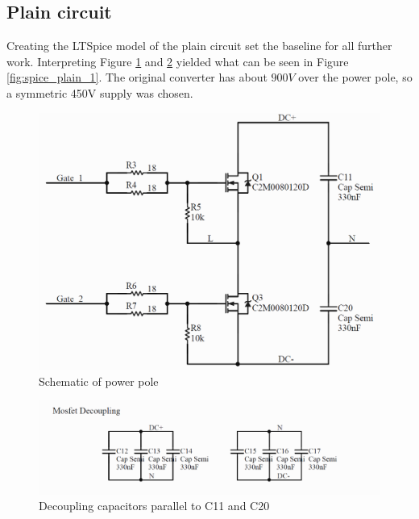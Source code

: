 \subsection{Plain circuit}
\label{sec:plain}

Creating the LTSpice model of the plain circuit set the baseline for all further work. Interpreting Figure \ref{fig:schematic_altium_1} and \ref{fig:schematic_altium_2} yielded what can be seen in Figure \ref{fig:spice_plain_1}. The original converter has about $900V$ over the power pole, so a symmetric 450V supply was chosen.

\begin{figure}[H]
	\centering
	\includegraphics[width=\textwidth]{pictures/implementation/schematic_altium_1.PNG}
	\caption{Schematic of power pole}
	\label{fig:schematic_altium_1}
\end{figure}

\begin{figure}[H]
	\centering
	\includegraphics[width=\textwidth]{pictures/implementation/schematic_altium_2.PNG}
	\caption{Decoupling capacitors parallel to C11 and C20}
	\label{fig:schematic_altium_2}
\end{figure}

